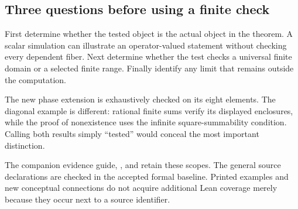 \subsection{Three questions before using a finite check}
First determine whether the tested object is the actual object in the theorem. A scalar simulation can illustrate an operator-valued statement without checking every dependent fiber. Next determine whether the test checks a universal finite domain or a selected finite range. Finally identify any limit that remains outside the computation.

The new phase extension is exhaustively checked on its eight elements. The diagonal example is different: rational finite sums verify its displayed enclosures, while the proof of nonexistence uses the infinite square-summability condition. Calling both results simply ``tested'' would conceal the most important distinction.

The companion evidence guide, , and  retain these scopes. The general source declarations are checked in the accepted formal baseline. Printed examples and new conceptual connections do not acquire additional Lean coverage merely because they occur next to a source identifier.
